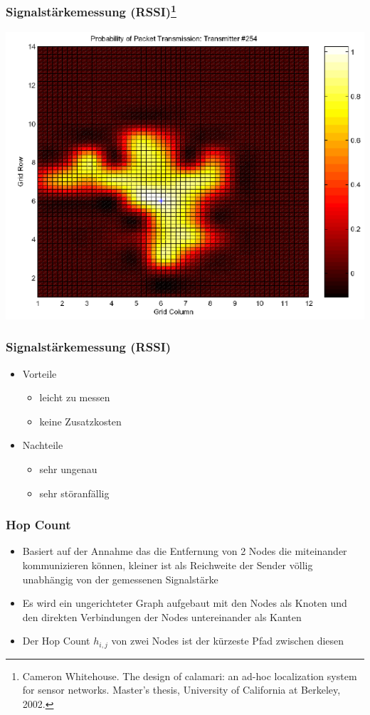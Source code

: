\begin{frame}
\frametitle{Signalstärkemessung (RSSI)\footnote{Cameron Whitehouse. The design of calamari: an ad-hoc localization
system for sensor networks. Master’s thesis, University of California at
Berkeley, 2002.}}
  \begin{center}
  \includegraphics[scale=0.5]{img/RSSI1}
  \end{center}
\end{frame}

\begin{frame}
\frametitle{Signalstärkemessung (RSSI)}
\begin{itemize}
  \item Vorteile
  \begin{itemize}
    \item leicht zu messen
    \item keine Zusatzkosten
  \end{itemize}
  \item Nachteile
  \begin{itemize}
    \item sehr ungenau
    \item sehr störanfällig
  \end{itemize}
\end{itemize}
\end{frame}

\begin{frame}
\frametitle{Hop Count}

\begin{itemize}
  \item Basiert auf der Annahme das die Entfernung von 2 Nodes die
    miteinander kommunizieren können, kleiner ist als Reichweite der
    Sender völlig unabhängig von der gemessenen Signalstärke
  \item Es wird ein ungerichteter Graph aufgebaut mit den Nodes als
    Knoten und den direkten Verbindungen der Nodes untereinander als
    Kanten
  \item Der Hop Count $h_{i,j}$ von zwei Nodes ist der kürzeste Pfad
    zwischen diesen
\end{itemize}
\end{frame}

